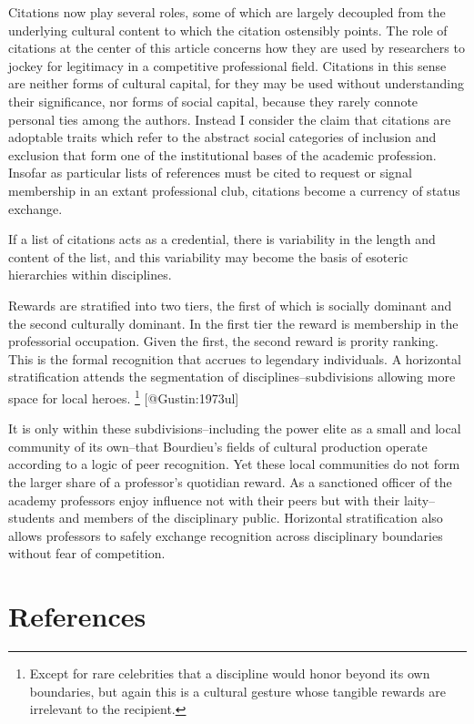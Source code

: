 \documentclass[]{article}
\begin{document}
Citations now play several roles, some of which are largely decoupled
from the underlying cultural content to which the citation ostensibly
points. The role of citations at the center of this article concerns how
they are used by researchers to jockey for legitimacy in a competitive
professional field. Citations in this sense are neither forms of
cultural capital, for they may be used without understanding their
significance, nor forms of social capital, because they rarely connote
personal ties among the authors. Instead I consider the claim that
citations are adoptable traits which refer to the abstract social
categories of inclusion and exclusion that form one of the institutional
bases of the academic profession. Insofar as particular lists of
references must be cited to request or signal membership in an extant
professional club, citations become a currency of status exchange.

If a list of citations acts as a credential, there is variability in the
length and content of the list, and this variability may become the
basis of esoteric hierarchies within disciplines.

Rewards are stratified into two tiers, the first of which is socially
dominant and the second culturally dominant. In the first tier the
reward is membership in the professorial occupation. Given the first,
the second reward is prority ranking. This is the formal recognition
that accrues to legendary individuals. A horizontal stratification
attends the segmentation of disciplines--subdivisions allowing more
space for local heroes. \footnote{Except for rare celebrities that a
  discipline would honor beyond its own boundaries, but again this is a
  cultural gesture whose tangible rewards are irrelevant to the
  recipient.} {[}@Gustin:1973ul{]}

It is only within these subdivisions--including the power elite as a
small and local community of its own--that Bourdieu's fields of cultural
production operate according to a logic of peer recognition. Yet these
local communities do not form the larger share of a professor's
quotidian reward. As a sanctioned officer of the academy professors
enjoy influence not with their peers but with their laity--students and
members of the disciplinary public. Horizontal stratification also
allows professors to safely exchange recognition across disciplinary
boundaries without fear of competition.

\section{References}\label{references}
\end{document}
